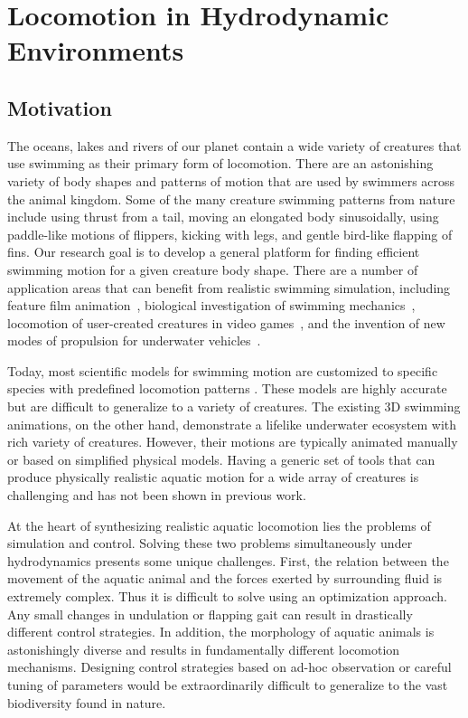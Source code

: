 \chapter{Locomotion in Hydrodynamic Environments}

\section{Motivation}

The oceans, lakes and rivers of our planet contain a wide variety of
creatures that use swimming as their primary form of locomotion.  There are
an astonishing variety of body shapes and patterns of motion that are used
by swimmers across the animal kingdom.  Some of the many creature swimming
patterns from nature include using thrust from a tail, moving an elongated
body sinusoidally, using paddle-like motions of flippers, kicking with legs,
and gentle bird-like flapping of fins.  Our research goal is to develop a
general platform for finding efficient swimming motion for a given creature
body shape.  There are a number of application areas that can benefit from
realistic swimming simulation, including feature film
animation~\cite{stanton2003finding}, biological investigation of swimming
mechanics~\cite{kern2006simulations,shirgaonkar2008hydrodynamics},
locomotion of user-created creatures in video games~\cite{hecker2008real},
and the invention of new modes of propulsion for underwater
vehicles~\cite{barrett2002optimal}.

Today, most scientific models for swimming motion are customized to specific
species with predefined locomotion patterns
\cite{shirgaonkar2008hydrodynamics}. These models are
highly accurate but are difficult to generalize to a variety of creatures.
The existing 3D swimming animations, on the other hand, demonstrate a
lifelike underwater ecosystem with rich variety of creatures. However, their motions are typically animated
manually or based on simplified physical models. Having a generic set of
tools that can produce physically realistic aquatic motion for a wide array
of creatures is challenging and has not been shown in previous work.

At the heart of synthesizing realistic aquatic locomotion lies the
problems of simulation and control. Solving these two problems
simultaneously under hydrodynamics presents some unique
challenges. First, the relation between the movement of the aquatic
animal and the forces exerted by surrounding fluid is extremely
complex. Thus it is difficult to solve using an optimization approach. Any small
changes in undulation or flapping gait can result in drastically
different control strategies. In addition, the morphology of aquatic
animals is astonishingly diverse and results in fundamentally
different locomotion mechanisms. Designing control strategies based on
ad-hoc observation or careful tuning of parameters would be extraordinarily difficult to generalize to the vast biodiversity found in nature.

